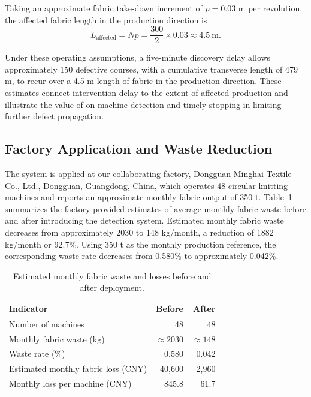 \documentclass[journal]{IEEEtranTIE}
\begin{document}
Taking an approximate fabric take-down increment of $p=0.03$ m per revolution, the affected fabric length in the production direction is
\begin{equation}
L_{\mathrm{affected}}=Np
=\frac{300}{2}\times0.03
\approx4.5\ \mathrm{m}.
\label{eq:affected-fabric-length}
\end{equation}

Under these operating assumptions, a five-minute discovery delay allows approximately 150 defective courses, with a cumulative transverse length of 479 m, to recur over a 4.5 m length of fabric in the production direction. These estimates connect intervention delay to the extent of affected production and illustrate the value of on-machine detection and timely stopping in limiting further defect propagation.

\subsection{Factory Application and Waste Reduction}
\label{sec:factory-benefits}
The system is applied at our collaborating factory, Dongguan Minghai Textile Co., Ltd., Dongguan, Guangdong, China, which operates 48 circular knitting machines and reports an approximate monthly fabric output of 350 t. Table~\ref{tab:factory-benefits} summarizes the factory-provided estimates of average monthly fabric waste before and after introducing the detection system. Estimated monthly fabric waste decreases from approximately 2030 to 148 kg/month, a reduction of 1882 kg/month or 92.7\%. Using 350 t as the monthly production reference, the corresponding waste rate decreases from 0.580\% to approximately 0.042\%.

\begin{table}[!tbp]
\caption{Estimated monthly fabric waste and losses before and after deployment.}
\label{tab:factory-benefits}
\centering
\footnotesize
\setlength{\tabcolsep}{3pt}
\renewcommand{\arraystretch}{1.08}
\begin{tabular*}{\columnwidth}{@{\extracolsep{\fill}}lrr@{}}
\toprule
Indicator & Before & After \\
\midrule
Number of machines & 48 & 48 \\
Monthly fabric waste (kg) & $\approx2030$ & $\approx148$ \\
Waste rate (\%) & 0.580 & 0.042 \\
Estimated monthly fabric loss (CNY) & 40,600 & 2,960 \\
Monthly loss per machine (CNY) & 845.8 & 61.7 \\
\bottomrule
\end{tabular*}
\renewcommand{\arraystretch}{1.0}
\end{table}
\end{document}
